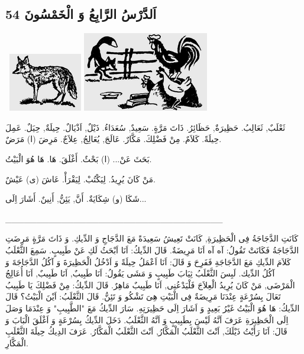 \documentclass[a5paper]{article}
\begin{document}
\subsection{اَلدَّرْسُ الرَّابِعُ وَ الْخَمْسُونَ 54}
\  \includegraphics[width=1.2602in,height=1in]{images/MuhammadBagauddinprettified-img176.png}   \includegraphics[width=2.1665in,height=1.3646in]{images/MuhammadBagauddinprettified-img177.png} 

ثَعْلَبٌ, ثَعَالِبُ. حَظِيرَةٌ, حَظَائِرُ. ذَاتَ مَرَّةٍ. سَعِيدٌ, سُعَدَاءُ. ذَيْلٌ, اَذْيَالٌ. حِيلَةٌ, حِيَلٌ. عَمِلَ حِيلَةً. كَلاَمٌ. مِنْ فَضْلِكَ. مَكَّارٌ. عَالَجَ, يُعَالِجُ, عِلاَجٌ. مَرِضَ (ا) مَرَضٌ. 

بَحَثَ عَنْ... (ا) بَحْثٌ. أَغْلَقَ. هَا. هَا هُوَ الْبَيْتُ. 

مَنْ كَانَ يُرِيدُ. لِيَكْتُبْ. لِيَقْرَأْ. عَاشَ (ى) عَيْشٌ. 

شَكَا (و) شِكَايَةٌ. أَنَّ, يَئِنُّ, أَنِينٌ. أَشَارَ اِلَى...

\_\_\_\_\_\_\_\_\_\_\_\_\_\_\_\_\_\_\_\_\_\_\_\_\_\_\_\_\_\_\_\_\_\_\_

كَانَتِ الدَّجَاجَةُ فِى الْحَظِيرَةِ, كَانَتْ تَعِيشُ سَعِيدَةً مَعَ الدَّجَاجِ وَ الدِّيكِ. وَ ذَاتَ مَرَّةٍ مَرِضَتِ الدَّجَاجَةُ فَكَانَتْ تَقُولُ: آه آه اَنَا مَرِيضَةٌ. قَالَ الدِّيكُ: اَنَا اَبْحَثُ لَكِ عَنْ طَبِيبٍ. سَمِعَ الثَّعْلَبُ كَلاَمَ الدِّيكِ مَعَ الدَّجَاجَةِ فَفَرِحَ وَ قَالَ: اَنَا اَعْمَلُ حِيلَةً وَ اَدْخُلُ الْحَظِيرَةَ وَ آكُلُ الدَّجَاجَةَ وَ آكُلُ الدِّيك. لَبِسَ الثَّعْلَبُ ثِيَابَ طَبِيبٍ وَ مَشَى يَقُولُ: اَنَا طَبِيبٌ, اَنَا طَبِيبٌ, اَنَا أُعَالِجُ الْمَرْضَى, مَنْ كَانَ يُرِيدُ الْعِلاَجَ فَلْيَدْعُنِى, اَنَا طَبِيبٌ مَاهِرٌ. قَالَ الدِّيكُ: مِنْ فَضْلِكَ يَا طَبِيبُ تَعَالَ بِسُرْعَةٍ عِنْدَنَا مَرِيضَةٌ فِى الْبَيْتِ هِىَ تَشْكُو وَ تَئِنُّ. قَالَ الثَّعْلَبُ: اَيْنَ الْبَيْتُ؟ قَالَ الدِّيكُ: هَا هُوَ الْبَيْتُ غَيْرُ بَعِيدٍ وَ اَشَارَ اِلَى حَظِيرَتِهِ. سَارَ الدِّيكُ مَعَ "الطَّبِيبِ" وَ عِنْدَمَا وَصَلَ اِلَى الْحَظِيرَةِ عَرَفَ اَنَّهُ لَيْسَ بِطَبِيبٍ وَ اَنَّهُ الثَّعْلَبُ. دَخَلَ الدِّيكُ بِسُرْعَةٍ وَ اَغْلَقَ الْبَابَ وَ قَالَ: اَنَا رَأَيْتُ ذَيْلَكَ, اَنْتَ الثَّعْلَبُ الْمَكَّارُ, اَنْتَ الثَّعْلَبُ الْمَكَّارُ. عَرَفَ الدِيكُ حِيلَةَ الثَّعْلَبِ الْمَكَّارِ.
\end{document}

